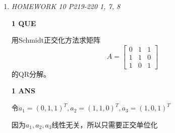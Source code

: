 \documentclass[11pt,letterpaper]{ctexart}
\begin{document}
\begin{enumerate}
3. 输出分解结果：矩阵$L$为单位下三角矩阵，矩阵$U$为上三角矩阵，即$A = LU$。

注意：在算法中，$L_{ij}$表示矩阵$L$的第$i$行第$j$列的元素，$U_{ij}$表示矩阵$U$的第$i$行第$j$列的元素，$A_{ij}$表示矩阵$A$的第$i$行第$j$列的元素。


\textbf{3 QUE}
\bigskip

设A为实对称正定矩阵,且Gauss消去法第一步得到的矩阵为 \[ A^{(1)} = \begin{array}{cc:cc}
	a_{11} :& a_{12}  \dots a_{1n} \\
	\hline
	0 \quad:& \\
	\vdots \quad :&        B \\
	0 \quad:& 
\end{array}
	\]
证明B仍是实对称正定矩阵，且对角元素不增加。

\textbf{3 ANS}
\bigskip

设$A = (a_{ij})_{n \times n}, a = (a_{21}, \ldots, a_{n1})^T$,由于A对称，所以A可分块为 $A = \begin{bmatrix}
	a_{11} & a^T \\
	a & A_1
\end{bmatrix}$,其中$A_1$是n - 1阶对称矩阵，于是 \[ A^{(1)} = \begin{bmatrix}
	a_{11} & a^T \\
	0 & A_1 - \frac{aa^T}{a_{11}}
\end{bmatrix}\]

	容易证$B^T = B$。任取非零列向量$y \in R^{n - 1}$, 则$x = \begin{bmatrix}
		-\frac{a^T y}{a_{11}} \\
		y
	\end{bmatrix} \neq 0$从而$x^TAx > 0$ 

	故 $B = A_1 - \frac{aa^T}{a_{11}}$是正定矩阵。

\item \textit{HOMEWORK 10 {P219-220 1, 7, 8}}%

\textbf{1 QUE}
\bigskip

用Schmidt正交化方法求矩阵 \[ A = \begin{bmatrix}
	0 & 1 & 1 \\
	1 & 1 & 0 \\
	1 & 0 & 1 
\end{bmatrix}\]的QR分解。

\textbf{1 ANS}
\bigskip

令$a_1 = (0, 1, 1)^T, a_2 = (1, 1, 0)^T, a_3 = (1, 0, 1)^T$

因为$a_1, a_2, a_3$线性无关，所以只需要正交单位化


\end{enumerate}
\end{document}
